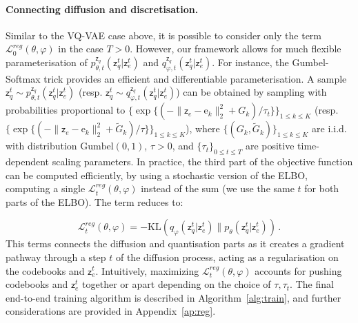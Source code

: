 \documentclass[nohyperref]{article}
\theoremstyle{plain}
\theoremstyle{definition}
\theoremstyle{remark}
\newcommand{\latentcont}{\mathsf{z}_e}
\newcommand{\latentdis}{\mathsf{z}_q}
\newcommand{\rme}{\mathrm{e}}
\newcommand{\embed}{\rme}
\begin{document}
\paragraph{Connecting diffusion and discretisation. } Similar to the VQ-VAE case above, it is possible to consider only the term $\mathcal{L}^{reg}_0(\theta,\varphi)$ in the case $T > 0$. However, our framework allows for much flexible parameterisation of $p_{\theta,t}^{\latentdis}(\latentdis^t|\latentcont^t)$ and $q_{\varphi,t}^{\latentdis}(\latentdis^t|\latentcont^t)$. For instance, the Gumbel-Softmax trick provides an efficient and differentiable parameterisation. A sample $\latentdis^t\sim  p_{\theta,t}^{\latentdis}(\latentdis^t|\latentcont^t)$ (resp. $\latentdis^t\sim q_{\varphi,t}^{\latentdis}(\latentdis^t|\latentcont^t)$) can be obtained by sampling with probabilities proportional to $\{\exp\{(-\|\latentcont - \embed_k\|^2_2 + G_k )/\tau_t\}\}_{1\leq k \leq K}$ (resp. $\{\exp\{(-\|\latentcont - \embed_k\|^2_2 + \tilde G_k )/\tau\}\}_{1\leq k \leq K}$), where $\{(G_k,\tilde G_k)\}_{1\leq k \leq K}$ are i.i.d. with distribution $\mathrm{Gumbel}(0,1)$, $\tau>0$, and $\{\tau_t\}_{0\leq t \leq T}$ are positive  time-dependent scaling parameters. In practice, the third part of the objective function can be computed efficiently, by using a stochastic version of the ELBO, computing a single $\mathcal{L}^{reg}_t(\theta,\varphi)$ instead of the sum (we use the same $t$ for both parts of the ELBO). The term reduces to:

\begin{equation}
    \mathcal{L}^{reg}_t(\theta,\varphi) = -\mathrm{KL}(q_\varphi(\latentdis^{t}|\latentcont^{t})\|p_\theta(\latentdis^{t}|\latentcont^{t}))\,. 
\end{equation}
This terms connects the diffusion and quantisation parts as it creates a gradient pathway through a step $t$ of the diffusion process, acting as a regularisation on the codebooks and $\latentcont^t$. Intuitively, maximizing $\mathcal{L}^{reg}_t(\theta,\varphi)$  accounts for pushing codebooks and $\latentcont^t$ together or apart depending on the choice of $\tau, \tau_t$. The final end-to-end training algorithm is described in Algorithm~\ref{alg:train}, and further considerations are provided  in Appendix~\ref{ap:reg}.
\end{document}
